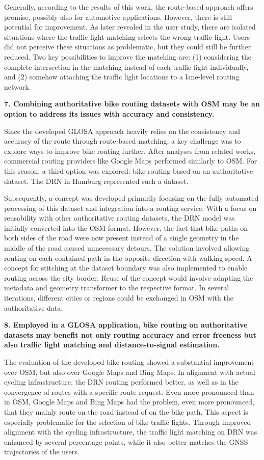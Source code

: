 Generally, according to the results of this work, the route-based approach offers promise, possibly also for automotive applications. However, there is still potential for improvement. As later revealed in the user study, there are isolated situations where the traffic light matching selects the wrong traffic light. Users did not perceive these situations as problematic, but they could still be further reduced. Two key possibilities to improve the matching are: (1) considering the complete intersection in the matching instead of each traffic light individually, and (2) somehow attaching the traffic light locations to a lane-level routing network. 

\textbf{\color{cidarkblue}7. Combining authoritative bike routing datasets with OSM may be an option to address its issues with accuracy and consistency.}

Since the developed GLOSA approach heavily relies on the consistency and accuracy of the route through route-based matching, a key challenge was to explore ways to improve bike routing further. After analyses from related works, commercial routing providers like Google Maps performed similarly to OSM. For this reason, a third option was explored: bike routing based on an authoritative dataset. The DRN in Hamburg represented such a dataset. 

Subsequently, a concept was developed primarily focusing on the fully automated processing of this dataset and integration into a routing service. With a focus on reusability with other authoritative routing datasets, the DRN model was initially converted into the OSM format. However, the fact that bike paths on both sides of the road were now present instead of a single geometry in the middle of the road caused unnecessary detours. The solution involved allowing routing on each contained path in the opposite direction with walking speed. A concept for stitching at the dataset boundary was also implemented to enable routing across the city border. Reuse of the concept would involve adapting the metadata and geometry transformer to the respective format. In several iterations, different cities or regions could be exchanged in OSM with the authoritative data.

\newpage
\textbf{\color{cidarkblue}8. Employed in a GLOSA application, bike routing on authoritative datasets may benefit not only routing accuracy and error freeness but also traffic light matching and distance-to-signal estimation.} 

The evaluation of the developed bike routing showed a substantial improvement over OSM, but also over Google Maps and Bing Maps. In alignment with actual cycling infrastructure, the DRN routing performed better, as well as in the convergence of routes with a specific route request. Even more pronounced than in OSM, Google Maps and Bing Maps had the problem, even more pronounced, that they mainly route on the road instead of on the bike path. This aspect is especially problematic for the selection of bike traffic lights. Through improved alignment with the cycling infrastructure, the traffic light matching on DRN was enhanced by several percentage points, while it also better matches the GNSS trajectories of the users. 

